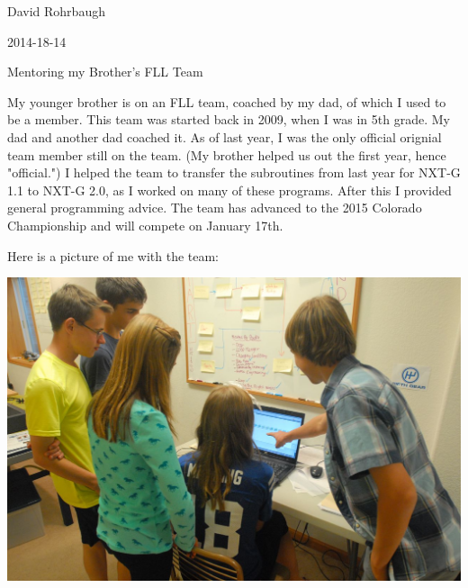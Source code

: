 David Rohrbaugh

2014-18-14

Mentoring my Brother's FLL Team

\medskip

My younger brother is on an FLL team, coached by my dad, of which I used to be a member. This team was started back in 2009, when I was in 5th grade. My dad and another dad coached it. As of last year, I was the only official orignial team member still on the team. (My brother helped us out the first year, hence "official.") I helped the team to transfer the subroutines from last year for NXT-G 1.1 to NXT-G 2.0, as I worked on many of these programs. After this I provided general programming advice. The team has advanced to the 2015 Colorado Championship and will compete on January 17th.

\medskip

Here is a picture of me with the team:

\begin{center}
 \includegraphics[width=\textwidth]{./Entries/Images/mentoring.jpg}
\end{center}
